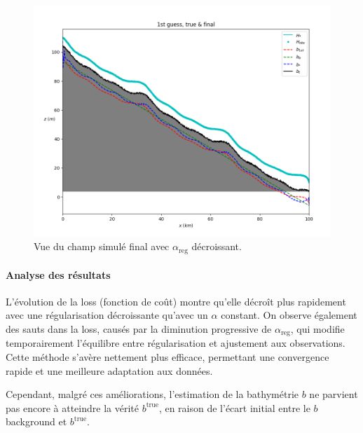 \documentclass{article}
\begin{document}
\begin{figure}[H]
    \vspace{0.5cm}
    
    \begin{minipage}[b]{0.8\linewidth}
        \centering
        \includegraphics[width=\linewidth]{Images_Ayoub/With_Regularisation/Decreasing_Alpha/Viwe.png}
        \caption{Vue du champ simulé final avec \(\alpha_{\text{reg}}\) décroissant.}
        \label{fig:dec-view}
    \end{minipage}
\end{figure}



\paragraph{Analyse des résultats}
L'évolution de la loss (fonction de coût) montre qu'elle décroît plus rapidement avec une régularisation décroissante qu'avec un \(\alpha\) constant. On observe également des sauts dans la loss, causés par la diminution progressive de \(\alpha_{\text{reg}}\), qui modifie temporairement l'équilibre entre régularisation et ajustement aux observations. Cette méthode s'avère nettement plus efficace, permettant une convergence rapide et une meilleure adaptation aux données.

Cependant, malgré ces améliorations, l'estimation de la bathymétrie \(b\) ne parvient pas encore à atteindre la vérité \(b^{\text{true}}\), en raison de l'écart initial entre le \(b\) background et \(b^{\text{true}}\).
\end{document}
